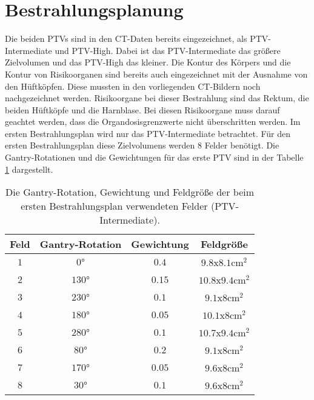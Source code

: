 \section{Bestrahlungsplanung}
\label{sec:Bestrahlungsplanung}
Die beiden PTVs sind in den CT-Daten bereits eingezeichnet, als PTV-Intermediate und PTV-High. Dabei ist das PTV-Intermediate das größere Zielvolumen und das PTV-High das kleiner. Die Kontur des Körpers und die Kontur von Risikoorganen sind bereits auch eingezeichnet mit der Ausnahme von den Hüftköpfen. Diese mussten in den vorliegenden CT-Bildern noch nachgezeichnet werden. Risikoorgane bei dieser Bestrahlung sind das Rektum, die beiden Hüftköpfe und die Harnblase. Bei diesen Risikoorgane muss darauf geachtet werden, dass die Organdosisgrenzwerte nicht überschritten werden. Im ersten Bestrahlungsplan wird nur das PTV-Intermediate betrachtet. Für den ersten Bestrahlungsplan diese Zielvolumens werden 8 Felder benötigt. Die Gantry-Rotationen und die Gewichtungen für das erste PTV sind in der Tabelle \ref{tab:Felder1} dargestellt. 

\begin{table}
	\centering
	\caption{Die Gantry-Rotation, Gewichtung und Feldgröße der beim ersten Bestrahlungsplan verwendeten Felder (PTV-Intermediate).}
	\label{tab:Felder1}
	\begin{tabular}{c c c c}
		\toprule
		Feld & Gantry-Rotation & Gewichtung & Feldgröße\\
		\midrule
		$1$ & $0°$   & $0.4$ & $\num{9.8}$x$\num{8.1} \si{\centi\meter\squared}$ \\
		$2$ & $130°$  & $0.15$ & $\num{10.8}$x$\num{9.4} \si{\centi\meter\squared}$ \\
		$3$ & $230°$ & $0.1$ & $\num{9.1}$x$\num{8} \si{\centi\meter\squared}$ \\
		$4$ & $180°$ & $0.05$ & $\num{10.1}$x$\num{8} \si{\centi\meter\squared}$ \\
		$5$ & $280°$ & $0.1$ & $\num{10.7}$x$\num{9.4} \si{\centi\meter\squared}$ \\
		$6$ & $80°$ & $0.2$ & $\num{9.1}$x$\num{8} \si{\centi\meter\squared}$ \\
		$7$ & $170°$ & $0.05$ & $\num{9.6}$x$\num{8} \si{\centi\meter\squared}$ \\
		$8$ & $30°$ & $0.1$ & $\num{9.6}$x$\num{8} \si{\centi\meter\squared}$ \\
		\bottomrule
	\end{tabular}
\end{table}

